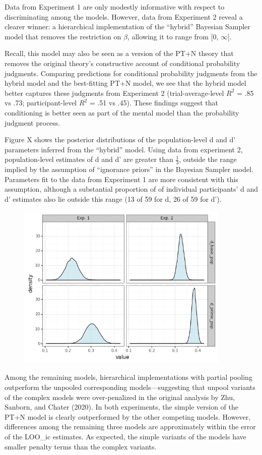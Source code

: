 \documentclass{article}
\begin{document}
Data from Experiment 1 are only modestly informative with respect to
discriminating among the models. However, data from Experiment 2 reveal
a clearer winner: a hierarchical implementation of the ``hybrid''
Bayesian Sampler model that removes the restriction on \(\beta\),
allowing it to range from {[}0, \(\infty\){]}.

Recall, this model may also be seen as a version of the PT+N theory that
removes the original theory's constructive account of conditional
probability judgments. Comparing predictions for conditional probability
judgments from the hybrid model and the best-fitting PT+N model, we see
that the hybrid model better captures these judgments from Experiment 2
(trial-average-level \(R^2\) = .85 vs .73; participant-level \(R^2\) =
.51 vs .45). These findings suggest that conditioning is better seen as
part of the mental model than the probability judgment process.

Figure X shows the posterior distributions of the population-level d and
d' parameters inferred from the ``hybrid'' model. Using data from
experiment 2, population-level estimates of d and d' are greater than
\(\frac{1}{3}\), outside the range implied by the assumption of
``ignorance priors'' in the Bayesian Sampler model. Parameters fit to
the data from Experiment 1 are more consistent with this assumption,
although a substantial proportion of of individual participants' d and
d' estimates also lie outside this range (13 of 59 for d, 26 of 59 for
d').

\begin{figure}[ht]
\centering
\includegraphics[width=4in]{plot_params.png}
\end{figure}

Among the remaining models, hierarchical implementations with partial
pooling outperform the unpooled corresponding models---suggesting that
unpool variants of the complex models were over-penalized in the
original analysis by Zhu, Sanborn, and Chater (2020). In both
experiments, the simple version of the PT+N model is clearly
outperformed by the other competing models. However, differences among
the remaining three models are approximately within the error of the
LOO\_ic estimates. As expected, the simple variants of the models have
smaller penalty terms than the complex variants.
\end{document}
